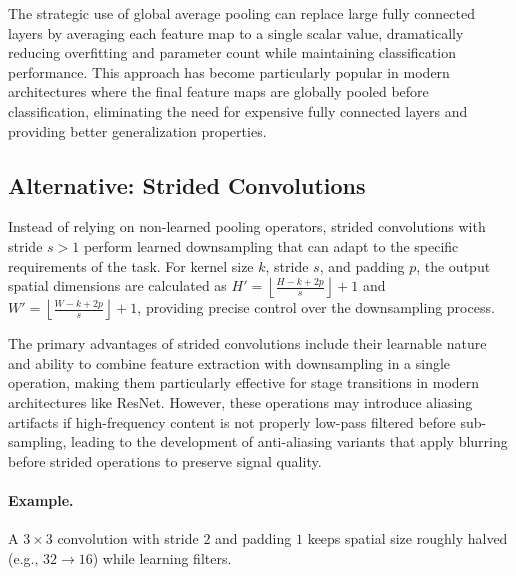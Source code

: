 The strategic use of global average pooling can replace large fully connected layers by averaging each feature map to a single scalar value, dramatically reducing overfitting and parameter count while maintaining classification performance. This approach has become particularly popular in modern architectures where the final feature maps are globally pooled before classification, eliminating the need for expensive fully connected layers and providing better generalization properties.\cite{GoodfellowEtAl2016}

\subsection{Alternative: Strided Convolutions}
\label{subsec:strided-convs}

Instead of relying on non-learned pooling operators, strided convolutions with stride $s>1$ perform learned downsampling that can adapt to the specific requirements of the task. For kernel size $k$, stride $s$, and padding $p$, the output spatial dimensions are calculated as $H' = \left\lfloor \frac{H - k + 2p}{s} \right\rfloor + 1$ and $W' = \left\lfloor \frac{W - k + 2p}{s} \right\rfloor + 1$, providing precise control over the downsampling process.

The primary advantages of strided convolutions include their learnable nature and ability to combine feature extraction with downsampling in a single operation, making them particularly effective for stage transitions in modern architectures like ResNet. However, these operations may introduce aliasing artifacts if high-frequency content is not properly low-pass filtered before sub-sampling, leading to the development of anti-aliasing variants that apply blurring before strided operations to preserve signal quality.\cite{He2016}

\paragraph{Example.} A $3\times3$ convolution with stride $2$ and padding $1$ keeps spatial size roughly halved (e.g., $32\to16$) while learning filters.

